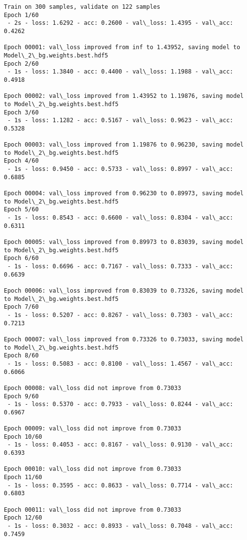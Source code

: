 \documentclass[11pt]{article}
\begin{document}
    \begin{Verbatim}[commandchars=\\\{\}]
Train on 300 samples, validate on 122 samples
Epoch 1/60
 - 2s - loss: 1.6292 - acc: 0.2600 - val\_loss: 1.4395 - val\_acc: 0.4262

Epoch 00001: val\_loss improved from inf to 1.43952, saving model to Model\_2\_bg.weights.best.hdf5
Epoch 2/60
 - 1s - loss: 1.3840 - acc: 0.4400 - val\_loss: 1.1988 - val\_acc: 0.4918

Epoch 00002: val\_loss improved from 1.43952 to 1.19876, saving model to Model\_2\_bg.weights.best.hdf5
Epoch 3/60
 - 1s - loss: 1.1282 - acc: 0.5167 - val\_loss: 0.9623 - val\_acc: 0.5328

Epoch 00003: val\_loss improved from 1.19876 to 0.96230, saving model to Model\_2\_bg.weights.best.hdf5
Epoch 4/60
 - 1s - loss: 0.9450 - acc: 0.5733 - val\_loss: 0.8997 - val\_acc: 0.6885

Epoch 00004: val\_loss improved from 0.96230 to 0.89973, saving model to Model\_2\_bg.weights.best.hdf5
Epoch 5/60
 - 1s - loss: 0.8543 - acc: 0.6600 - val\_loss: 0.8304 - val\_acc: 0.6311

Epoch 00005: val\_loss improved from 0.89973 to 0.83039, saving model to Model\_2\_bg.weights.best.hdf5
Epoch 6/60
 - 1s - loss: 0.6696 - acc: 0.7167 - val\_loss: 0.7333 - val\_acc: 0.6639

Epoch 00006: val\_loss improved from 0.83039 to 0.73326, saving model to Model\_2\_bg.weights.best.hdf5
Epoch 7/60
 - 1s - loss: 0.5207 - acc: 0.8267 - val\_loss: 0.7303 - val\_acc: 0.7213

Epoch 00007: val\_loss improved from 0.73326 to 0.73033, saving model to Model\_2\_bg.weights.best.hdf5
Epoch 8/60
 - 1s - loss: 0.5083 - acc: 0.8100 - val\_loss: 1.4567 - val\_acc: 0.6066

Epoch 00008: val\_loss did not improve from 0.73033
Epoch 9/60
 - 1s - loss: 0.5370 - acc: 0.7933 - val\_loss: 0.8244 - val\_acc: 0.6967

Epoch 00009: val\_loss did not improve from 0.73033
Epoch 10/60
 - 1s - loss: 0.4053 - acc: 0.8167 - val\_loss: 0.9130 - val\_acc: 0.6393

Epoch 00010: val\_loss did not improve from 0.73033
Epoch 11/60
 - 1s - loss: 0.3595 - acc: 0.8633 - val\_loss: 0.7714 - val\_acc: 0.6803

Epoch 00011: val\_loss did not improve from 0.73033
Epoch 12/60
 - 1s - loss: 0.3032 - acc: 0.8933 - val\_loss: 0.7048 - val\_acc: 0.7459


\end{Verbatim}
\end{document}
